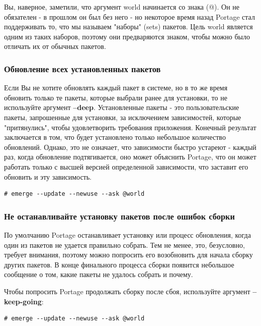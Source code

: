 \documentclass[10pt]{book}
\begin{document}
Вы, наверное, заметили, что аргумент world начинается со знака (@). Он не обязателен - в прошлом он был без него - но некоторое время назад Portage стал поддерживать то, что мы называем "наборы" (sets) пакетов.
Цель world является одним из таких наборов, поэтому они предваряются знаком, чтобы можно было отличать их от обычных пакетов.

\subsubsection{Обновление всех установленных пакетов} 

Если Вы не хотите обновлять каждый пакет в системе, но в то же время обновить только те пакеты, которые выбрали ранее для установки, то не используйте аргумент \textbf{--deep}. Установленные пакеты - это пользовательские пакеты, запрошенные для установки, за исключением зависимостей, которые "притянулись", чтобы удовлетворить требования приложения. Конечный результат заключается в том, что будет установлено только небольшое количество обновлений. Однако, это не означает, что зависимости быстро устареют - каждый раз, когда обновление подтягивается,  оно может объяснить Portage, что он может работать только с высшей версией определенной зависимости, что заставит его обновить и эту зависимость.

\begin{tcolorbox}
\begin{lstlisting}
# emerge --update --newuse --ask @world
\end{lstlisting}
\end{tcolorbox}

\subsubsection{Не останавливайте установку пакетов после ошибок сборки}

По умолчанию Portage останавливает установку или процесс обновления, когда один из пакетов не удается правильно собрать. Тем не менее, это, безусловно, требует внимания, поэтому можно попросить его возобновить для начала сборку других пакетов. В конце финального процесса сборки появится небольшое сообщение о том, какие пакеты не удалось собрать и почему.

Чтобы попросить Portage продолжать сборку после сбоя, используйте аргумент \textbf{--keep-going}:

\begin{tcolorbox}
\begin{lstlisting}
# emerge --update --newuse --ask @world
\end{lstlisting}
\end{tcolorbox}
\end{document}
